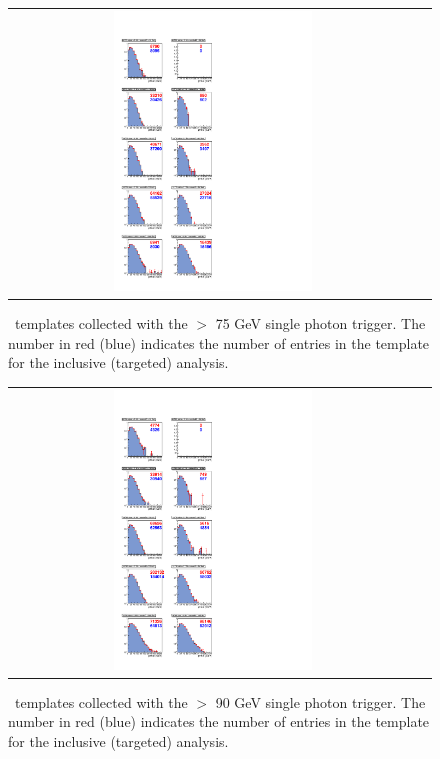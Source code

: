 \clearpage

\begin{figure}[!h]
\begin{center}
\begin{tabular}{cc}
\includegraphics[width=0.5\textwidth]{plots/template_targeted_3_19fb.pdf}
\end{tabular}
\caption{
\MET\ templates collected with the \pt $>$ 75 GeV single photon trigger.
The number in red (blue) indicates the number of entries in the template for the inclusive (targeted) analysis.
}
\end{center}
\end{figure}

\clearpage

\begin{figure}[!h]
\begin{center}
\begin{tabular}{cc}
\includegraphics[width=0.5\textwidth]{plots/template_targeted_4_19fb.pdf}
\end{tabular}
\caption{
\MET\ templates collected with the \pt $>$ 90 GeV single photon trigger.
The number in red (blue) indicates the number of entries in the template for the inclusive (targeted) analysis.
}
\end{center}
\end{figure}
